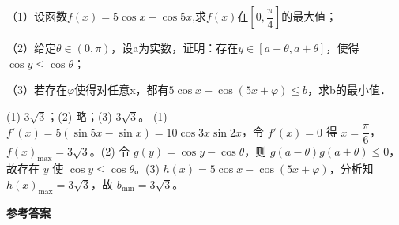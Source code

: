 \documentclass[12pt,a4paper]{article}%
\begin{document}
\begin{question}
（1）设函数$f(x)=5\cos x-\cos 5x$,求$f(x)$在$\left[ 0,\dfrac{\pi}{4} \right]$的最大值；

（2）给定$\theta \in (0,\pi)$，设a为实数，证明：存在$y\in [a-\theta ,a+\theta ]$，使得$\cos y\le \cos \theta $；

（3）若存在$\varphi $使得对任意x，都有$5\cos x-\cos (5x+\varphi )\le b$，求b的最小值．

\end{question}
\begin{answer}{(1) $3\sqrt3$；(2) 略；(3) $3\sqrt3$。}
(1) $f'(x)=5(\sin5x-\sin x)=10\cos3x\sin2x$，令 $f'(x)=0$ 得 $x=\dfrac{\pi}{6}$，$f(x)_{\max}=3\sqrt3$。(2) 令 $g(y)=\cos y-\cos\theta$，则 $g(a-\theta)g(a+\theta)\le0$，故存在 $y$ 使 $\cos y\le\cos\theta$。(3) $h(x)=5\cos x-\cos(5x+\varphi)$，分析知 $h(x)_{\max}=3\sqrt3$，故 $b_{\min}=3\sqrt3$。
\end{answer}

\ifshowans\else
\newpage
\begin{center}
{\Large \textbf{参考答案}}
\end{center}
\printAnswerCheck
\fi
\end{document}
